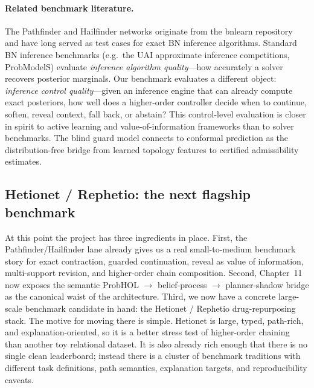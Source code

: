 \documentclass[11pt,openany]{report}
\begin{document}
\paragraph{Related benchmark literature.}
The Pathfinder and Hailfinder networks originate from the bnlearn
repository~\cite{ScutariBnRepository} and have long served as test cases
for exact BN inference algorithms.  Standard BN inference benchmarks
(e.g.\ the UAI approximate inference competitions, ProbModelS) evaluate
\emph{inference algorithm quality}---how accurately a solver recovers
posterior marginals.  Our benchmark evaluates a different object:
\emph{inference control quality}---given an inference engine that can
already compute exact posteriors, how well does a higher-order
controller decide when to continue, soften, reveal context, fall back,
or abstain?  This control-level evaluation is closer in spirit to active
learning and value-of-information frameworks than to solver benchmarks.
The blind guard model connects to conformal prediction as the
distribution-free bridge from learned topology features to certified
admissibility estimates.

\subsection{Hetionet / Rephetio: the next flagship benchmark}

At this point the project has three ingredients in place.  First, the
Pathfinder/Hailfinder lane already gives us a real small-to-medium
benchmark story for exact contraction, guarded continuation, reveal as
value of information, multi-support revision, and higher-order chain
composition.  Second, Chapter~11 now exposes the semantic
ProbHOL $\rightarrow$ belief-process $\rightarrow$ planner-shadow bridge
as the canonical waist of the architecture.  Third, we now have a
concrete large-scale benchmark candidate in hand: the Hetionet /
Rephetio drug-repurposing stack.\cite{Himmelstein2017Rephetio,DhimmelHetioRepData}
The motive for moving there is simple.  Hetionet is large, typed,
path-rich, and explanation-oriented, so it is a better stress test of
higher-order chaining than another toy relational dataset.  It is also
already rich enough that there is no single clean leaderboard; instead
there is a cluster of benchmark traditions with different task
definitions, path semantics, explanation targets, and reproducibility
caveats.\cite{Liu2021NeuralMultiHopBioKG,Jimenez2024XG4Repo,Himmelstein2022HetnetConnectivity,Nunes2024RExDrugRepurposing,Bonner2022KGEDrugDiscovery,PerdomoQuinteiro2024KGDrugRepurposingReview,KGScopingReview2025DrugRepurposing}
\end{document}
